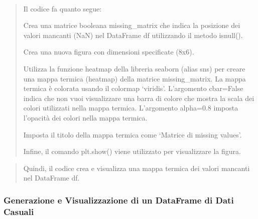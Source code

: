 \documentclass[11pt]{article}
\begin{document}
    \begin{center}
    \end{center}
    { \hspace*{\fill} \\}
    
    \begin{quote}
Il codice fa quanto segue:

Crea una matrice booleana missing\_matrix che indica la posizione dei
valori mancanti (NaN) nel DataFrame df utilizzando il metodo isnull().

Crea una nuova figura con dimensioni specificate (8x6).

Utilizza la funzione heatmap della libreria seaborn (alias sns) per
creare una mappa termica (heatmap) della matrice missing\_matrix. La
mappa termica è colorata usando il colormap `viridis'. L'argomento
cbar=False indica che non vuoi visualizzare una barra di colore che
mostra la scala dei colori utilizzati nella mappa termica. L'argomento
alpha=0.8 imposta l'opacità dei colori nella mappa termica.

Imposta il titolo della mappa termica come `Matrice di missing values'.

Infine, il comando plt.show() viene utilizzato per visualizzare la
figura.
\end{quote}

\begin{quote}
Quindi, il codice crea e visualizza una mappa termica dei valori
mancanti nel DataFrame df.
\end{quote}

    \subsubsection{Generazione e Visualizzazione di un DataFrame di Dati
Casuali}\label{generazione-e-visualizzazione-di-un-dataframe-di-dati-casuali}
\end{document}
